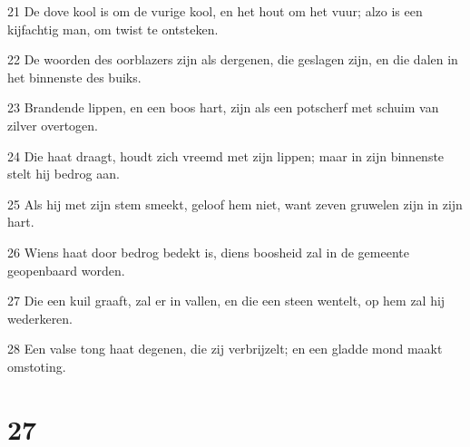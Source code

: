 \par 21 De dove kool is om de vurige kool, en het hout om het vuur; alzo is een kijfachtig man, om twist te ontsteken.
\par 22 De woorden des oorblazers zijn als dergenen, die geslagen zijn, en die dalen in het binnenste des buiks.
\par 23 Brandende lippen, en een boos hart, zijn als een potscherf met schuim van zilver overtogen.
\par 24 Die haat draagt, houdt zich vreemd met zijn lippen; maar in zijn binnenste stelt hij bedrog aan.
\par 25 Als hij met zijn stem smeekt, geloof hem niet, want zeven gruwelen zijn in zijn hart.
\par 26 Wiens haat door bedrog bedekt is, diens boosheid zal in de gemeente geopenbaard worden.
\par 27 Die een kuil graaft, zal er in vallen, en die een steen wentelt, op hem zal hij wederkeren.
\par 28 Een valse tong haat degenen, die zij verbrijzelt; en een gladde mond maakt omstoting.

\chapter{27}

